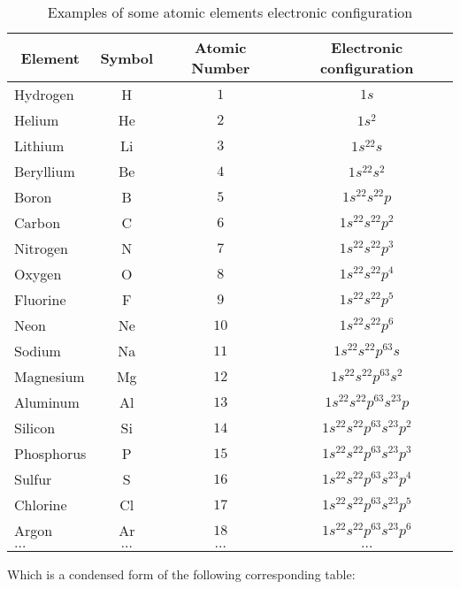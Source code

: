 	\begin{table}[H]
		\begin{center}
				\begin{tabular}{|l|c|c|c|}
					\hline
					\multicolumn{1}{c}{\cellcolor{black!30}\textbf{Element}} & 
	  \multicolumn{1}{c}{\cellcolor{black!30}\textbf{Symbol}} & 
	  \multicolumn{1}{c}{\cellcolor{black!30}\textbf{Atomic Number}}  & \multicolumn{1}{c}{\cellcolor{black!30}\textbf{Electronic configuration}} \\ \hline
				Hydrogen & H & $1$ & $1s$ \\ \hline
				Helium & He & $2$ & $1s^2$ \\ \hline
				Lithium & Li & $3$ & $1s^22s$ \\ \hline
				Beryllium & Be & $4$ & $1s^22s^2$ \\ \hline
				Boron & B & $5$ & $1s^22s^22p$ \\ \hline
				Carbon & C & $6$ & $1s^22s^22p^2$ \\ \hline
				Nitrogen & N & $7$ & $1s^22s^22p^3$ \\ \hline
				Oxygen & O & $8$ & $1s^22s^22p^4$ \\ \hline
				Fluorine & F & $9$ & $1s^22s^22p^5$ \\ \hline
				Neon & Ne & $10$ & $1s^22s^22p^6$ \\ \hline
				Sodium & Na & $11$ & $1s^22s^22p^63s$ \\ \hline
				Magnesium & Mg & $12$ & $1s^22s^22p^63s^2$ \\ \hline
				Aluminum & Al & $13$ & $1s^22s^22p^63s^23p$ \\ \hline
				Silicon & Si & $14$ & $1s^22s^22p^63s^23p^2$ \\ \hline
				Phosphorus & P & $15$ & $1s^22s^22p^63s^23p^3$ \\ \hline
				Sulfur & S & $16$ & $1s^22s^22p^63s^23p^4$ \\ \hline
				Chlorine & Cl & $17$ & $1s^22s^22p^63s^23p^5$ \\ \hline
				Argon & Ar & $18$ & $1s^22s^22p^63s^23p^6$ \\ \hline
				$\ldots$ & $\ldots$ & $\ldots$ & $\ldots$  \\ \hline
			\end{tabular}
		\end{center}
		\caption{Examples of some atomic elements electronic configuration}
	\end{table}
	Which is a condensed form of the following corresponding table:
